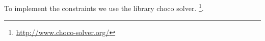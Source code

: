 To implement the constraints we use the library choco solver. \footnote{\url{http://www.choco-solver.org/}}.